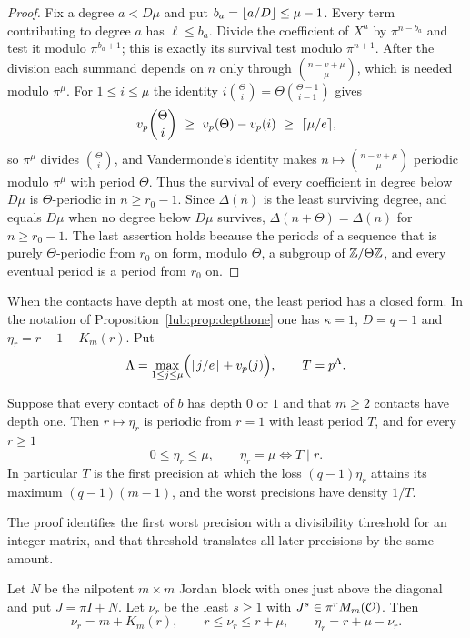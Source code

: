 \begin{proof}
Fix a degree $a<D\mu$ and put $b_a=\lfloor a/D\rfloor\le\mu-1$. Every term contributing to degree $a$
has $\ell\le b_a$. Divide the coefficient of $X^a$ by $\pi^{n-b_a}$ and test it modulo
$\pi^{b_a+1}$; this is exactly its survival test modulo $\pi^{n+1}$. After the division each
summand depends on $n$ only through $\binom{n-v+\mu}{\mu}$, which is needed modulo $\pi^{\mu}$.
For $1\le i\le\mu$ the identity $i\binom{\Theta}{i}=\Theta\binom{\Theta-1}{i-1}$ gives
\[
 v_p\binom{\Theta}{i}\ \ge\ v_p(\Theta)-v_p(i)\ \ge\ \ceil{\mu/e},
\]
so $\pi^{\mu}$ divides $\binom{\Theta}{i}$, and Vandermonde's identity makes
$n\mapsto\binom{n-v+\mu}{\mu}$ periodic modulo $\pi^{\mu}$ with period $\Theta$. Thus the
survival of every coefficient in degree below $D\mu$ is $\Theta$-periodic in $n\ge r_0-1$.
Since $\Delta(n)$ is the least surviving degree, and equals $D\mu$ when no degree below $D\mu$
survives, $\Delta(n+\Theta)=\Delta(n)$ for $n\ge r_0-1$. The last assertion holds because the
periods of a sequence that is purely $\Theta$-periodic from $r_0$ on form, modulo $\Theta$, a
subgroup of $\mathbb{Z}/\Theta\mathbb{Z}$, and every eventual period is a period from $r_0$ on.
\end{proof}

When the contacts have depth at most one, the least period has a closed form. In the notation
of Proposition~\ref{lub:prop:depthone} one has $\kappa=1$, $D=q-1$ and
$\eta_r=r-1-K_m(r)$. Put
\begin{equation}\label{lub:eq:leastexp}
 \Lambda=\max_{1\le j\le\mu}\Bigl(\lceil j/e\rceil+v_p(j)\Bigr),\qquad T=p^{\Lambda}.
\end{equation}

\begin{theorem}\label{lub:thm:leastperiod}
Suppose that every contact of $b$ has depth $0$ or $1$ and that $m\ge2$ contacts have depth
one. Then $r\mapsto\eta_r$ is periodic from $r=1$ with least period $T$, and for every $r\ge1$
\[
 0\le\eta_r\le\mu,\qquad \eta_r=\mu\iff T\mid r .
\]
In particular $T$ is the first precision at which the loss $(q-1)\eta_r$ attains its maximum
$(q-1)(m-1)$, and the worst precisions have density $1/T$.
\end{theorem}

The proof identifies the first worst precision with a divisibility threshold for an integer
matrix, and that threshold translates all later precisions by the same amount.

\begin{lemma}\label{lub:lem:jordan}
Let $N$ be the nilpotent $m\times m$ Jordan block with ones just above the diagonal and put
$J=\pi I+N$. Let $\nu_r$ be the least $s\ge1$ with $J^s\in\pi^rM_m(\mathcal{O})$. Then
\[
 \nu_r=m+K_m(r),\qquad r\le\nu_r\le r+\mu,\qquad \eta_r=r+\mu-\nu_r .
\]
\end{lemma}

